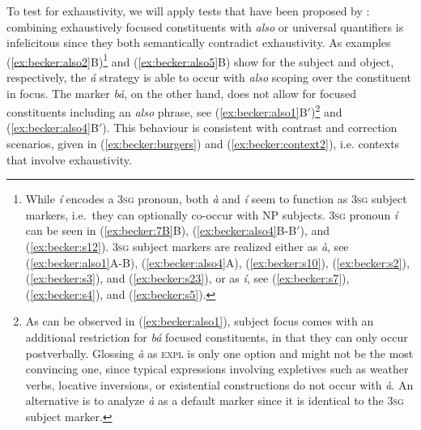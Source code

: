 \documentclass[output=paper,
modfonts
]{langscibook}
\begin{document}
\ea \label{ex:becker:burgers}
\z\z
To test for exhaustivity, we will apply tests that have been proposed by  \citet{Kiss1998}: combining exhaustively focused constituents with \textit{also} or universal quantifiers is infelicitous since they both semantically contradict exhaustivity. 
As examples (\ref{ex:becker:also2}B)\footnote{While {\em \'i} encodes a \textsc{3sg} pronoun, both {\em \`a} and {\em \'i} seem to function as \textsc{3sg} subject markers, i.e.\ they can optionally co-occur with NP subjects. \textsc{3sg} pronoun {\em \'i} can be seen in (\ref{ex:becker:7B}B), (\ref{ex:becker:also4}B-B$'$), and (\ref{ex:becker:s12}). \textsc{3sg} subject markers are realized either as {\em \`a}, see (\ref{ex:becker:also1}A-B), (\ref{ex:becker:also4}A), (\ref{ex:becker:s10}), (\ref{ex:becker:s2}), (\ref{ex:becker:s3}), and (\ref{ex:becker:s23}), or as {\em \'i}, see (\ref{ex:becker:s7}), (\ref{ex:becker:s4}), and (\ref{ex:becker:s5}).} and  (\ref{ex:becker:also5}B) show for the subject and object,  respectively, the {\em \'a} strategy is able to occur with {\em also} scoping over the constituent in focus. The marker \textit{bá}, on the other hand, does not allow for focused constituents including an \textit{also} phrase, see (\ref{ex:becker:also1}B$'$)\footnote{As can be observed in (\ref{ex:becker:also1}), subject focus comes with an additional restriction for {\em b\'a} focused constituents, in that they can only occur postverbally. Glossing {\em \`a} as \textsc{expl} is only one option and might not be the most convincing one, since typical expressions involving expletives such as weather verbs, locative inversions, or existential constructions do not occur with {\em \`a}. An alternative is to analyze {\em \`a} as a default marker since it is identical to the \textsc{3sg} subject marker.} and (\ref{ex:becker:also4}B$'$). This behaviour is consistent with contrast and correction scenarios, given in (\ref{ex:becker:burgers}) and (\ref{ex:becker:context2}), i.e. contexts that involve exhaustivity.
\end{document}
